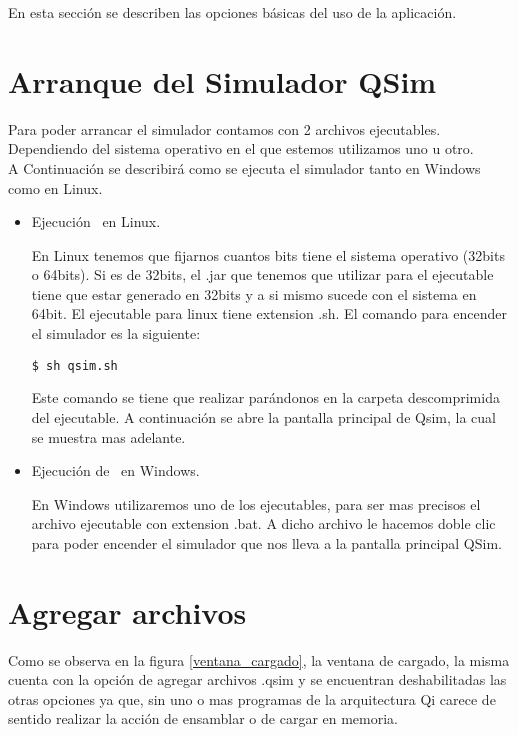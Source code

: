 
En esta sección se describen las opciones básicas del uso de la aplicación.

\section{Arranque del Simulador QSim}
Para poder arrancar el simulador contamos con 2 archivos ejecutables. 
Dependiendo del sistema operativo en el que estemos utilizamos uno u otro.\\

A Continuación se describirá como se ejecuta el simulador \qsim tanto en Windows como en Linux.
\begin{itemize}

\item Ejecución \qsim\ en Linux.

En Linux tenemos que fijarnos cuantos bits tiene el sistema operativo (32bits o 64bits). Si es de 32bits, el .jar que tenemos que utilizar para el ejecutable tiene que estar generado en 32bits y a si mismo sucede con el sistema en 64bit. El ejecutable para linux tiene extension .sh. El comando para encender el simulador es la siguiente:

\begin{verbatim}
$ sh qsim.sh
\end{verbatim}

Este comando se tiene que realizar parándonos en la carpeta descomprimida del ejecutable. 
A continuación se abre la pantalla principal de Qsim, la cual se muestra mas adelante.

\item Ejecución de \qsim\ en Windows.

En Windows utilizaremos uno de los ejecutables, para ser mas precisos el archivo ejecutable con extension .bat.
A dicho archivo le hacemos doble clic para poder encender el simulador que nos lleva a la pantalla principal QSim.

 
\end{itemize}

\section{Agregar archivos}
Como se observa en la figura \ref{ventana_cargado}, la ventana de cargado, la misma cuenta con la opción de agregar archivos .qsim y se encuentran deshabilitadas las otras opciones ya que, sin uno o mas programas de la arquitectura Qi carece de sentido realizar la acción de ensamblar o de cargar en memoria.


